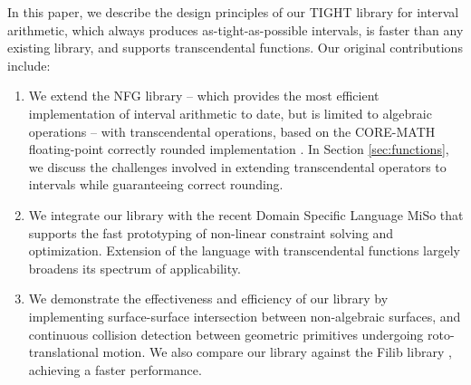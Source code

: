 In this paper, we describe the design principles of our TIGHT library for interval arithmetic, which always produces as-tight-as-possible intervals, is faster than any existing library, and supports transcendental functions.
%
Our original contributions include:
\begin{enumerate}
\item We extend the NFG library \cite{nfg} -- which provides the most efficient implementation of interval arithmetic to date, but is limited to algebraic operations -- with transcendental operations, based on the CORE-MATH floating-point correctly rounded implementation \cite{Sibidanov2022}.
In Section \ref{sec:functions}, we discuss the challenges involved in extending transcendental operators to intervals while guaranteeing correct rounding. 
\item We integrate our library with the recent Domain Specific Language MiSo \cite{Sichetti2025} that supports the fast prototyping of non-linear constraint solving and optimization. 
Extension of the language with transcendental functions largely broadens its spectrum of applicability. 
\item We demonstrate the effectiveness and efficiency of our library by implementing surface-surface intersection between non-algebraic surfaces, and continuous collision detection between geometric primitives undergoing roto-translational motion.  We also compare our library against the Filib library \cite{filib}, achieving a faster performance.
\end{enumerate}




